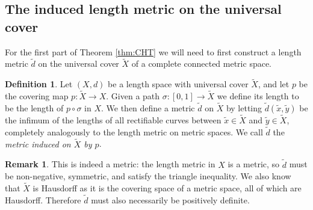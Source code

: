 \documentclass[11pt, a4paper, oneside]{memoir}
\theoremstyle{plain}\newtheorem{theorem}[subsection]{Theorem}
\theoremstyle{definition}
\newtheorem{definition}[subsection]{Definition}
\newtheorem{remark}[subsection]{Remark}
\newcommand{\twiddle}[1]{\widetilde{#1}}
\begin{document}
\subsection{The induced length metric on the universal cover}
For the first part of Theorem \ref{thm:CHT} we will need to first construct a length metric \(\twiddle{d}\) on the universal cover \(\twiddle{X}\) of a complete connected metric space.
\begin{definition}
\label{def::ind_metric_univ}
Let \((X,d)\) be a length space with universal cover $\twiddle{X}$, and let \(p\) be the covering map \(p:\twiddle{X}\to X\). 
Given a path \(\sigma:[0,1]\to\twiddle{X}\) we define its length to be the length of \(p\circ\sigma\) in \(X\).
We then define a metric \(\twiddle{d}\) on \(\twiddle{X}\) by letting \(\twiddle{d}(\twiddle{x},\twiddle{y})\) be the infimum of the lengths of all rectifiable curves between \(\twiddle{x}\in\twiddle{X}\) and \(\twiddle{y}\in\twiddle{X}\), completely analogously to the length metric on metric spaces.
We call \(\twiddle{d}\) the \textit{metric induced on \(\twiddle{X}\) by \(p\)}.
\end{definition}
\begin{remark}
This is indeed a metric: the length metric in \(X\) is a metric, so \(\twiddle{d}\) must be non-negative, symmetric, and satisfy the triangle inequality.
We also know that \(\twiddle{X}\) is Hausdorff as it is the covering space of a metric space, all of which are Hausdorff. Therefore \(\twiddle{d}\) must also necessarily be positively definite. 
\end{remark}
\end{document}
